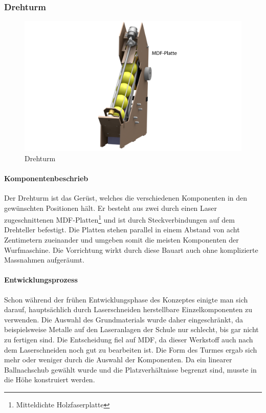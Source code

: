 \subsubsection{Drehturm}
\begin{figure}[h!]
	\centering
	\includegraphics[width=\linewidth]{../../fig/Render-Drehturmx}
	\caption{Drehturm}
	\label{fig:Drehturm}
\end{figure}

\paragraph{Komponentenbeschrieb}
Der Drehturm ist das Gerüst, welches die verschiedenen Komponenten in den gewünschten Positionen hält. Er besteht aus zwei durch einen Laser zugeschnittenen MDF-Platten\footnote{Mitteldichte Holzfaserplatte} und ist durch Steckverbindungen auf dem Drehteller befestigt. Die Platten stehen parallel in einem Abstand von acht Zentimetern zueinander und umgeben somit die meisten Komponenten der Wurfmaschine. Die Vorrichtung wirkt durch diese Bauart auch ohne komplizierte Massnahmen aufgeräumt.

\paragraph{Entwicklungsprozess}
Schon während der frühen Entwicklungsphase des Konzeptes einigte man sich darauf, hauptsächlich durch Laserschneiden herstellbare Einzelkomponenten zu verwenden. Die Auswahl des Grundmaterials wurde daher eingeschränkt, da beispielsweise Metalle auf den Laseranlagen der Schule nur schlecht, bis gar nicht zu fertigen sind. Die Entscheidung fiel auf MDF, da dieser Werkstoff auch nach dem Laserschneiden noch gut zu bearbeiten ist. Die Form des Turmes ergab sich mehr oder weniger durch die Auswahl der Komponenten. Da ein linearer Ballnachschub gewählt wurde und die Platzverhältnisse begrenzt sind, musste in die Höhe konstruiert werden.